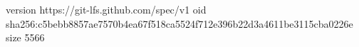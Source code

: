 version https://git-lfs.github.com/spec/v1
oid sha256:c5bebb8857ae7570b4ea67f518ca5524f712e396b22d3a4611be3115cba0226e
size 5566
